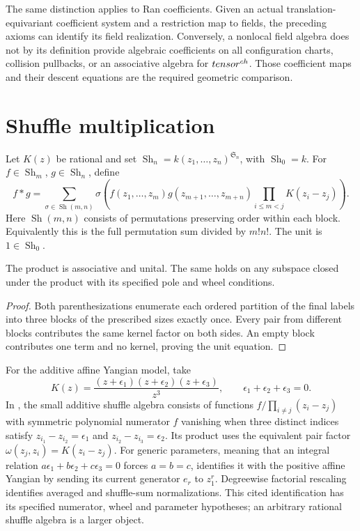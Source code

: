 The same distinction applies to Ran coefficients. Given an actual
translation-equivariant coefficient system and a restriction map to fields,
the preceding axioms can identify its field realization.
Conversely, a nonlocal field algebra does not by its definition provide
algebraic coefficients on all configuration charts, collision pullbacks,
or an associative algebra for $tensor^{ch}$.
Those coefficient maps and their descent equations are the required geometric comparison.

\section{Shuffle multiplication}
Let $K(z)$ be rational and set
$\operatorname{Sh}_n=k(z_1,\ldots,z_n)^{\mathfrak S_n}$, with
$\operatorname{Sh}_0=k$.
For $f\in\operatorname{Sh}_m$, $g\in\operatorname{Sh}_n$, define
\begin{equation}\label{eq:vol1-shuffle}
 f*g=\sum_{\sigma\in\operatorname{Sh}(m,n)}
 \sigma\left(f(z_1,\ldots,z_m)g(z_{m+1},\ldots,z_{m+n})
       \prod_{i\le m<j}K(z_i-z_j)\right).
\end{equation}
Here $\operatorname{Sh}(m,n)$ consists of permutations preserving order within
each block. Equivalently this is the full permutation sum divided by $m!n!$.
The unit is $1\in\operatorname{Sh}_0$.

\begin{proposition}
The product is associative and unital. The same holds on any subspace closed
under the product with its specified pole and wheel conditions.
\end{proposition}
\begin{proof}
Both parenthesizations enumerate each ordered partition of the final labels
into three blocks of the prescribed sizes exactly once.
Every pair from different blocks contributes the same kernel factor on both sides.
An empty block contributes one term and no kernel, proving the unit equation.
\end{proof}

For the additive affine Yangian model, take
\[
 K(z)=\frac{(z+\epsilon_1)(z+\epsilon_2)(z+\epsilon_3)}{z^3},
 \qquad\epsilon_1+\epsilon_2+\epsilon_3=0.
\]
In \cite[Section~7.3]{Tsymbaliuk}, the small additive shuffle algebra consists of
functions $f/\prod_{i\ne j}(z_i-z_j)$ with symmetric polynomial numerator $f$
vanishing when three distinct indices satisfy
$z_{i_1}-z_{i_2}=\epsilon_1$ and $z_{i_2}-z_{i_3}=\epsilon_2$.
Its product uses the equivalent pair factor $\omega(z_j,z_i)=K(z_i-z_j)$.
For generic parameters, meaning that an integral relation
$a\epsilon_1+b\epsilon_2+c\epsilon_3=0$ forces $a=b=c$,
\cite[Theorem~7.6]{Tsymbaliuk} identifies it with the positive affine Yangian
by sending its current generator $e_r$ to $z_1^r$.
Degreewise factorial rescaling identifies averaged and shuffle-sum normalizations.
This cited identification has its specified numerator, wheel and parameter hypotheses;
an arbitrary rational shuffle algebra is a larger object.


